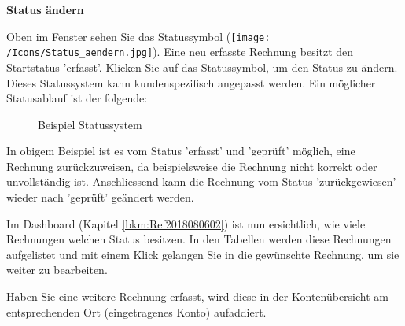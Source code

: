 \vspace{\baselineskip}

\pagebreak
\textbf{Status ändern}

\vspace{\baselineskip}

Oben im Fenster sehen Sie das Statussymbol (\texttt{[image: /Icons/Status\_aendern.jpg]}). Eine neu erfasste Rechnung besitzt den Startstatus 'erfasst'. Klicken Sie auf das Statussymbol, um den Status zu ändern. Dieses Statussystem kann kundenspezifisch angepasst werden. Ein möglicher Statusablauf ist der folgende:

\begin{figure}[H]
\caption{Beispiel Statussystem}
\end{figure}
In obigem Beispiel ist es vom Status 'erfasst' und 'geprüft' möglich, eine Rechnung zurückzuweisen, da beispielsweise die Rechnung nicht korrekt oder unvollständig ist. Anschliessend kann die Rechnung vom Status 'zurückgewiesen' wieder nach 'geprüft' geändert werden.

\vspace{\baselineskip}

Im Dashboard (Kapitel \ref{bkm:Ref2018080602}) ist nun ersichtlich, wie viele Rechnungen welchen Status besitzen. In den Tabellen werden diese Rechnungen aufgelistet und mit einem Klick gelangen Sie in die gewünschte Rechnung, um sie weiter zu bearbeiten.

\vspace{\baselineskip}

Haben Sie eine weitere Rechnung erfasst, wird diese in der Kontenübersicht am entsprechenden Ort (eingetragenes Konto) aufaddiert.
